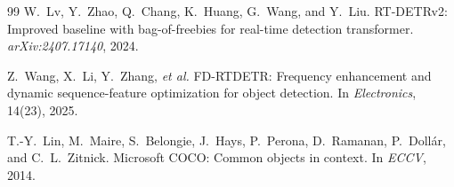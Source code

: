 \documentclass[10pt,twocolumn]{IEEEtran}
\begin{document}
\begin{thebibliography}{99}
W.~Lv, Y.~Zhao, Q.~Chang, K.~Huang, G.~Wang, and Y.~Liu.
RT-DETRv2: Improved baseline with bag-of-freebies for real-time detection transformer.
\emph{arXiv:2407.17140}, 2024.

Z.~Wang, X.~Li, Y.~Zhang, \textit{et al.}
FD-RTDETR: Frequency enhancement and dynamic sequence-feature optimization for object detection.
In \emph{Electronics}, 14(23), 2025.

T.-Y.~Lin, M.~Maire, S.~Belongie, J.~Hays, P.~Perona, D.~Ramanan,
P.~Doll\'ar, and C.~L.~Zitnick.
Microsoft COCO: Common objects in context.
In \emph{ECCV}, 2014.

\end{thebibliography}
\end{document}
